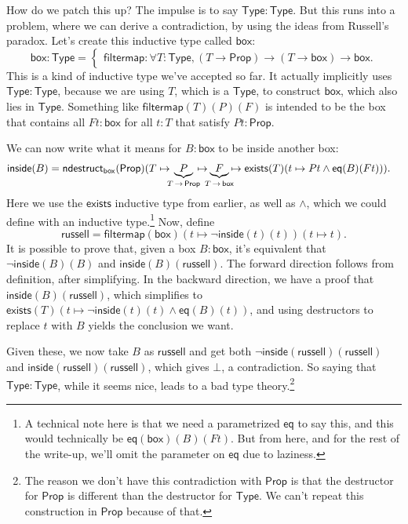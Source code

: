 \documentclass[11pt,paper=letter]{scrartcl}
\renewcommand{\sf}{\mathsf}
\renewcommand{\land}{\wedge}
\renewcommand{\lnot}{\neg}
\newcommand{\false}{\bot}
\newcommand{\prop}{\mathsf{Prop}}
\newcommand{\type}{\mathsf{Type}}
\newcommand{\sto}{\,\to\,}
\begin{document}
How do we patch this up? The impulse is to say $\type : \type$. But this runs into a problem, where we can derive a contradiction, by using the ideas from Russell's paradox. Let's create this inductive type called $\sf{box}$: \[
  \sf{box}: \type =
  \begin{cases}
  \sf{filtermap}: \forall T: \type, (T \to \prop) \to (T \to \sf{box}) \to \sf{box}.
  \end{cases}
\]
This is a kind of inductive type we've accepted so far. It actually implicitly uses $\type : \type$, because we are using $T$, which is a $\type$, to construct $\sf{box}$, which also lies in $\type$. Something like $\sf{filtermap}(T)(P)(F)$ is intended to be the box that contains all $Ft : \sf{box}$ for all $t : T$ that satisfy $Pt : \prop$.

We can now write what it means for $B : \sf{box}$ to be inside another box:
\begin{align*}
\sf{inside}(B) &=\sf{ndestruct}_{\sf{box}}(\prop)(
  T \mapsto
  \mkern-10mu
  \underbrace{P}_{T\sto \prop}
  \mkern-10mu
  \mapsto
  \mkern-10mu
  \underbrace{F}_{T\sto \sf{box}}
  \mkern-10mu
  \mapsto
  \sf{exists}(T)(t \mapsto Pt \land \sf{eq}(B)(Ft))
  ).
\end{align*}
Here we use the $\sf{exists}$ inductive type from earlier, as well as $\land$, which we could define with an inductive type.\footnote{A technical note here is that we need a parametrized $\sf{eq}$ to say this, and this would technically be $\sf{eq}(\sf{box})(B)(Ft)$. But from here, and for the rest of the write-up, we'll omit the parameter on $\sf{eq}$ due to laziness.} Now, define \[
  \sf{russell} = \sf{filtermap}(\sf{box})(t \mapsto \lnot \sf{inside}(t)(t))(t \mapsto t).
\]
It is possible to prove that, given a box $B : \sf{box}$, it's equivalent that $\lnot \sf{inside}(B)(B)$ and $\sf{inside}(B)(\sf{russell})$. The forward direction follows from definition, after simplifying. In the backward direction, we have a proof that $\sf{inside}(B)(\sf{russell})$, which simplifies to $\sf{exists}(T)(t \mapsto \lnot\sf{inside}(t)(t) \land \sf{eq}(B)(t))$, and using destructors to replace $t$ with $B$ yields the conclusion we want.

Given these, we now take $B$ as $\sf{russell}$ and get both $\lnot \sf{inside}(\sf{russell})(\sf{russell})$ and $\sf{inside}(\sf{russell})(\sf{russell})$, which gives $\false$, a contradiction. So saying that $\type : \type$, while it seems nice, leads to a bad type theory.\footnote{The reason we don't have this contradiction with $\prop$ is that the destructor for $\prop$ is different than the destructor for $\type$. We can't repeat this construction in $\prop$ because of that.}
\end{document}

